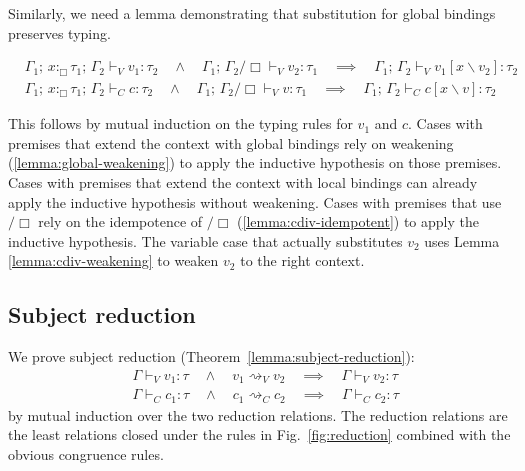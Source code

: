 \documentclass[acmsmall, screen, review, anonymous]{acmart}
\theoremstyle{definition}
\newcommand{\types}{\mathrel{:}}
\newcommand{\gtypes}{\mathrel{:_{\Box}}}
\newcommand{\ccons}[2]{#1;\,#2}
\newcommand{\gbind}[3]{\ccons{#1}{#2\gtypes#3}}
\newcommand{\cdiv}[1]{#1/\Box}
\newcommand{\sub}[2]{[#1\backslash#2]}
\newcommand{\sbst}[3]{#1\sub{#2}{#3}}
\newcommand{\turnv}{\mathrel{\vdash_V}}
\newcommand{\turnc}{\mathrel{\vdash_C}}
\newcommand{\stepstoname}{\rightsquigarrow}
\newcommand{\stepstov}{\stepstoname_V}
\newcommand{\stepstoc}{\stepstoname_C}
\begin{document}
Similarly, we need a lemma demonstrating that substitution for global bindings
preserves typing.
\begin{lemma}
\label{lemma:global-substitution}
  \begin{align*}
    &\ccons{\gbind{\Gamma_1}{x}{\tau_1}}{\Gamma_2} \turnv v_1 \types \tau_2
    \quad \wedge \quad \cdiv{\ccons{\Gamma_1}{\Gamma_2}} \turnv v_2 \types \tau_1
    \quad \implies \quad \ccons{\Gamma_1}{\Gamma_2} \turnv \sbst{v_1}{x}{v_2} \types \tau_2 \\
    &\ccons{\gbind{\Gamma_1}{x}{\tau_1}}{\Gamma_2} \turnc c \types \tau_2
    \quad \wedge \quad \cdiv{\ccons{\Gamma_1}{\Gamma_2}} \turnv v \types \tau_1
    \quad \implies \quad \ccons{\Gamma_1}{\Gamma_2} \turnc \sbst{c}{x}{v} \types \tau_2
  \end{align*}
\end{lemma}
This follows by mutual induction on the typing rules for $v_1$ and
$c$. Cases with premises that extend the context with global bindings
rely on weakening (\ref{lemma:global-weakening}) to apply the inductive
hypothesis on those premises. Cases with premises that extend the
context with local bindings can already apply the inductive hypothesis
without weakening. Cases with premises that use $\cdiv{}$ rely on the
idempotence of $\cdiv{}$ (\ref{lemma:cdiv-idempotent}) to apply the
inductive hypothesis. The variable case that actually substitutes $v_2$
uses Lemma \ref{lemma:cdiv-weakening} to weaken $v_2$ to the right
context.

\subsection{Subject reduction}

We prove subject reduction (Theorem~\ref{lemma:subject-reduction}):
\begin{align*}
  &\Gamma \turnv v_1 \types \tau
  \quad \wedge \quad v_1 \stepstov v_2
  \quad \implies \quad \Gamma \turnv v_2 \types \tau \\
  &\Gamma \turnc c_1 \types \tau
  \quad \wedge \quad c_1 \stepstoc c_2
  \quad \implies \quad \Gamma \turnc c_2 \types \tau
\end{align*}
by mutual induction over the two reduction relations. The reduction
relations are the least relations closed under the rules in
Fig.~\ref{fig:reduction} combined with the obvious congruence rules.
\end{document}
